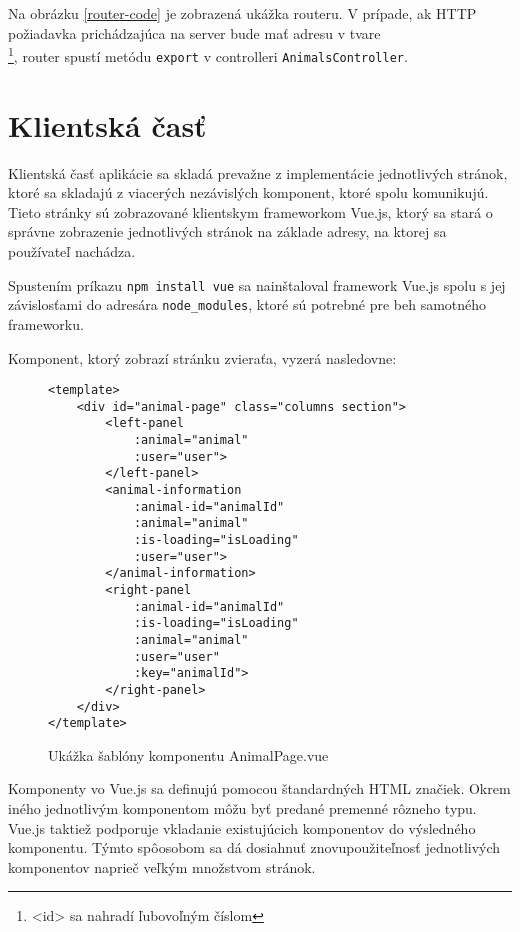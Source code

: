 Na obrázku \ref{router-code} je zobrazená ukážka routeru. V prípade, ak HTTP požiadavka prichádzajúca na server bude mať adresu v tvare\\ \footnote{<id> sa nahradí ľubovoľným číslom}, router spustí metódu \texttt{export} v controlleri \texttt{AnimalsController}.

\section{Klientská časť}
Klientská časť aplikácie sa skladá prevažne z implementácie jednotlivých stránok, ktoré sa skladajú z viacerých nezávislých komponent, ktoré spolu komunikujú. Tieto stránky sú zobrazované klientskym frameworkom Vue.js, ktorý sa stará o správne zobrazenie jednotlivých stránok na základe adresy, na ktorej sa používateľ nachádza.

Spustením príkazu \texttt{npm install vue} sa nainštaloval framework Vue.js spolu s jej závislosťami do adresára \texttt{node_modules}, ktoré sú potrebné pre beh samotného frameworku.

\pagebreak

Komponent, ktorý zobrazí stránku zvieraťa, vyzerá nasledovne:

\begin{figure}[H]
\begin{verbatim}
<template>
    <div id="animal-page" class="columns section">
        <left-panel
            :animal="animal"
            :user="user">
        </left-panel>
        <animal-information
            :animal-id="animalId"
            :animal="animal"
            :is-loading="isLoading"
            :user="user">
        </animal-information>
        <right-panel
            :animal-id="animalId"
            :is-loading="isLoading"
            :animal="animal"
            :user="user"
            :key="animalId">
        </right-panel>
    </div>
</template>
\end{verbatim}
\caption[Ukážka šablóny komponentu AnimalPage.vue]
{Ukážka šablóny komponentu AnimalPage.vue}
\label{animal-page-vue-code}
\end{figure}

Komponenty vo Vue.js sa definujú pomocou štandardných HTML značiek. Okrem iného jednotlivým komponentom môžu byť predané premenné rôzneho typu. Vue.js taktiež podporuje vkladanie existujúcich komponentov do výsledného komponentu. Týmto spôosobom sa dá dosiahnuť znovupoužiteľnosť jednotlivých komponentov naprieč veľkým množstvom stránok.

